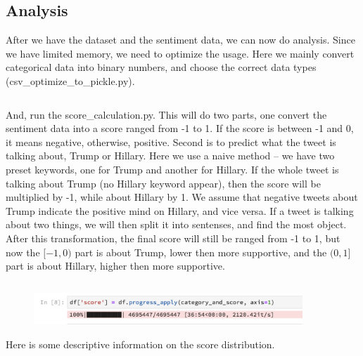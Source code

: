 \documentclass[12pt,a4paper]{article}
\begin{document}
  \subsection{Analysis}
    After we have the dataset and the sentiment data, we can now do analysis. Since we have limited memory, we need to optimize the usage. Here we mainly convert categorical data into binary numbers, and choose the correct data types (csv_optimize_to_pickle.py).

    \inputminted[mathescape, linenos, numbersep=5pt, frame=lines, framesep=2mm, breaklines]{python}{"../csv_optimize_to_pickle.py"}

    And, run the score_calculation.py. This will do two parts, one convert the sentiment data into a score ranged from -1 to 1. If the score is between -1 and 0, it means negative, otherwise, positive. Second is to predict what the tweet is talking about, Trump or Hillary. Here we use a naive method -- we have two preset keywords, one for Trump and another for Hillary. If the whole tweet is talking about Trump (no Hillary keyword appear), then the score will be multiplied by -1, while about Hillary by 1. We assume that negative tweets about Trump indicate the positive mind on Hillary, and vice versa. If a tweet is talking about two things, we will then split it into sentenses, and find the most object. After this transformation, the final score will still be ranged from -1 to 1, but now the $[-1, 0)$ part is about Trump, lower then more supportive, and the $(0, 1]$ part is about Hillary, higher then more supportive.

    \inputminted[mathescape, linenos, numbersep=5pt, frame=lines, framesep=2mm, breaklines]{python}{"../score_calculation.py"}

    \begin{figure}[H]
      \includegraphics[width=0.9\textwidth]{running.png}
      \centering
    \end{figure}

    Here is some descriptive information on the score distribution.
\end{document}
